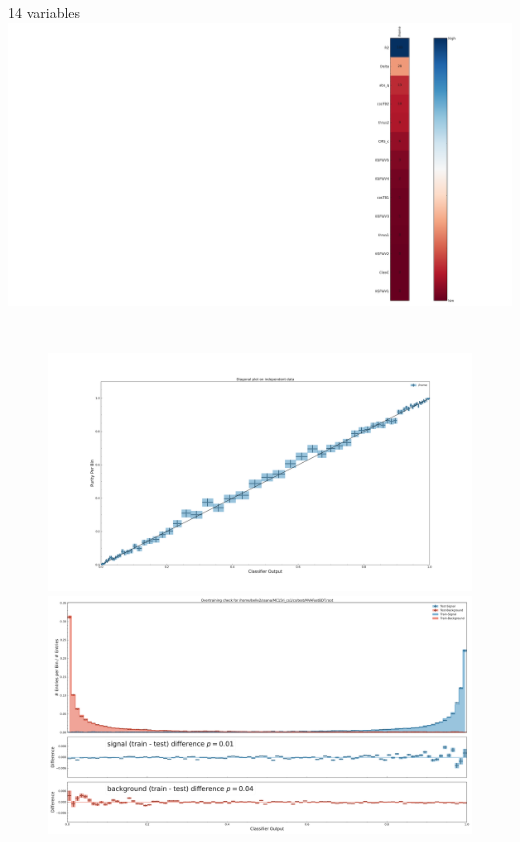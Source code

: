 \documentclass[12pt]{beamer}
\begin{document}
\begin{frame}{14 variables}
\hspace{-1in}
\includegraphics[width=1.25\textwidth]{evaluate_14/importance.pdf}
	\vspace{-3.3in}
	\begin{columns}
		\begin{figure}
			\includegraphics[width=1.0\textwidth]{evaluate_14/diagonal_plot_test.pdf}
			\includegraphics[width=1.0\textwidth]{evaluate_14/overtraining_plot_-6962044671939454446.pdf}
		\end{figure}
		
	\end{columns}
\end{frame}
\end{document}
